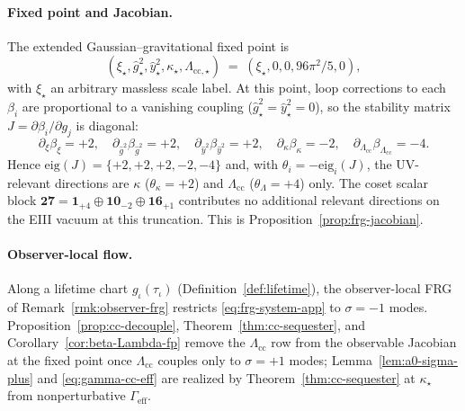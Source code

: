 \documentclass[aps,prd,onecolumn,amsmath,amssymb,nofootinbib,11pt]{revtex4-2}
\numberwithin{equation}{section}
\theoremstyle{plain}
\theoremstyle{definition}
\theoremstyle{remark}
\begin{document}
\paragraph{Fixed point and Jacobian.}
The extended Gaussian--gravitational fixed point is
\begin{equation}\label{eq:frg-fp}
  (\xi_\star,\hat g^2_\star,\hat y^2_\star,\kappa_\star,\Lambda_{\mathrm{cc},\star})
  \;=\;
  (\xi_\star,0,0,96\pi^2/5,0),
\end{equation}
with $\xi_\star$ an arbitrary massless scale label. At this point, loop
corrections to each $\beta_i$ are proportional to a vanishing coupling
($\hat g^2_\star=\hat y^2_\star=0$), so the stability matrix
$J=\partial\beta_i/\partial g_j$ is diagonal:
\begin{equation}\label{eq:jacobian-diag}
  \partial_{\xi}\beta_{\xi}=+2,\quad
  \partial_{\hat g^2}\beta_{\hat g^2}=+2,\quad
  \partial_{\hat y^2}\beta_{\hat y^2}=+2,\quad
  \partial_{\kappa}\beta_{\kappa}=-2,\quad
  \partial_{\Lambda_{\mathrm{cc}}}\beta_{\Lambda_{\mathrm{cc}}}=-4.
\end{equation}
Hence $\mathrm{eig}(J)=\{+2,+2,+2,-2,-4\}$ and, with
$\theta_i=-\mathrm{eig}_i(J)$, the UV-relevant directions are $\kappa$
($\theta_\kappa=+2$) and $\Lambda_{\mathrm{cc}}$ ($\theta_{\Lambda}=+4$) only.
The coset scalar block
$\mathbf{27}=\mathbf{1}_{+4}\oplus\mathbf{10}_{-2}\oplus\mathbf{16}_{+1}$
contributes no additional relevant directions on the EIII vacuum at this
truncation. This is Proposition~\ref{prop:frg-jacobian}.

\paragraph{Observer-local flow.}
Along a lifetime chart $g_\iota(\tau_\iota)$
(Definition~\ref{def:lifetime}), the observer-local FRG of
Remark~\ref{rmk:observer-frg} restricts \eqref{eq:frg-system-app} to
$\sigma=-1$ modes. Proposition~\ref{prop:cc-decouple},
Theorem~\ref{thm:cc-sequester}, and
Corollary~\ref{cor:beta-Lambda-fp} remove the $\Lambda_{\mathrm{cc}}$ row
from the observable Jacobian at the fixed point once $\Lambda_{\mathrm{cc}}$
couples only to $\sigma=+1$ modes; Lemma~\ref{lem:a0-sigma-plus} and
\eqref{eq:gamma-cc-eff} are realized by Theorem~\ref{thm:cc-sequester}
at $\kappa_\star$ from nonperturbative $\Gamma_{\mathrm{eff}}$.
\end{document}

